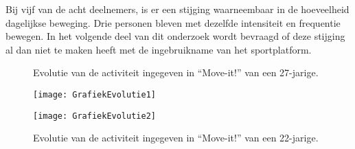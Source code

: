 Bij vijf van de acht deelnemers, is er een stijging waarneembaar in de hoeveelheid dagelijkse beweging. Drie personen bleven met dezelfde intensiteit en frequentie bewegen. In het volgende deel van dit onderzoek wordt bevraagd of deze stijging al dan niet te maken heeft met de ingebruikname van het sportplatform.

\begin{figure}[htbp]
    \begin{minipage}[t]{0.48\linewidth} %
        \centering
        \caption[Evolutie van de activiteit van een 27-jarige]{Evolutie van de activiteit ingegeven in ``Move-it!'' van een 27-jarige.}
        \texttt{[image: GrafiekEvolutie1]}
        \label{fig:evolutie1}
    \end{minipage}
    \hfill
    \begin{minipage}[t]{0.48\linewidth} %
        \centering
        \caption[Evolutie van de activiteit van een 22-jarige]{Evolutie van de activiteit ingegeven in ``Move-it!'' van een 22-jarige.}
        \texttt{[image: GrafiekEvolutie2]}
        \label{fig:evolutie2}
    \end{minipage}
\end{figure}

